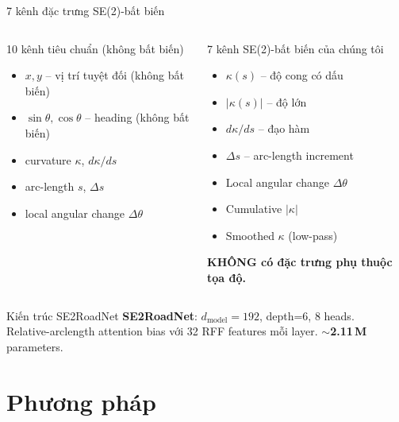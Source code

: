 \documentclass[aspectratio=169,10pt]{beamer}
\begin{document}
\begin{frame}{7 kênh đặc trưng SE(2)-bất biến}
\begin{columns}[T]
\begin{block}{10 kênh tiêu chuẩn (không bất biến)}
\scriptsize
\begin{itemize}
  \item $x, y$ -- vị trí tuyệt đối (\textcolor{alert}{không bất biến})
  \item $\sin\theta, \cos\theta$ -- heading (\textcolor{alert}{không bất biến})
  \item curvature $\kappa$, $d\kappa/ds$
  \item arc-length $s$, $\Delta s$
  \item local angular change $\Delta\theta$
\end{itemize}
\end{block}

\begin{exampleblock}{7 kênh SE(2)-bất biến của chúng tôi}
\scriptsize
\begin{itemize}
  \item $\kappa(s)$ -- độ cong có dấu
  \item $|\kappa(s)|$ -- độ lớn
  \item $d\kappa/ds$ -- đạo hàm
  \item $\Delta s$ -- arc-length increment
  \item Local angular change $\Delta\theta$
  \item Cumulative $|\kappa|$
  \item Smoothed $\kappa$ (low-pass)
\end{itemize}
\textbf{KHÔNG có đặc trưng phụ thuộc tọa độ.}
\end{exampleblock}
\end{columns}

\begin{block}{Kiến trúc SE2RoadNet}
\scriptsize
\textbf{SE2RoadNet}: $d_{\text{model}}=192$, depth=6, 8 heads. \\
Relative-arclength attention bias với 32 RFF features mỗi layer.
$\sim$\textbf{2.11\,M} parameters.
\end{block}
\end{frame}

\section{Phương pháp}
\end{document}

